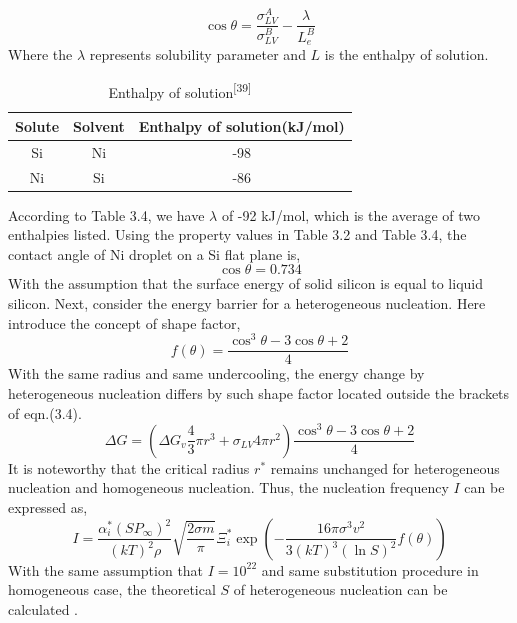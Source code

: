 \begin{equation}
\cos \theta=\frac{\sigma_{L V}^{A}}{\sigma_{L V}^{B}}-\frac{\lambda}{L_{e}^{B}}
\tag{3.1.13}
\end{equation}
Where  the $ \lambda $ represents solubility parameter and $L$ is the enthalpy of solution.
\begin{table}[H]
\caption{Enthalpy of solution\textsuperscript{[39]}}
\centering
\begin{tabular}{ccc}
\toprule
Solute & Solvent & Enthalpy of solution(kJ/mol) \\
\midrule
Si     & Ni      & -98                          \\
Ni     & Si      & -86                          \\
\bottomrule
\end{tabular}
\end{table}
According to Table 3.4,  we have  $ \lambda $ of -92 kJ/mol, which is the average of two enthalpies listed. 
Using the property values in Table 3.2 and Table 3.4, the contact angle of Ni droplet on a Si flat plane is,
\begin{equation}
\cos \theta=0.734
\tag{3.1.14}
\end{equation}
With the assumption that the surface energy of solid silicon is equal to liquid silicon. Next, consider the energy barrier for a heterogeneous nucleation. Here introduce the concept of shape factor,
\begin{equation}
f(\theta)=\frac{\cos ^{3} \theta-3 \cos \theta+2}{4}
\tag{3.1.15}
\end{equation}
With the same radius and same undercooling, the energy change by heterogeneous nucleation differs by such shape factor located outside the brackets of eqn.(3.4).
\begin{equation}
\Delta G=\left(\Delta G_{v} \frac{4}{3} \pi r^{3}+\sigma_{L V} 4 \pi r^{2}\right) \frac{\cos ^{3} \theta-3 \cos \theta+2}{4}
\tag{3.1.16}
\end{equation}
It is noteworthy that the critical radius $r^{*}$ remains unchanged for heterogeneous nucleation and homogeneous nucleation. Thus, the nucleation frequency $I$ can be expressed as,
\begin{equation}
I=\frac{\alpha_{i}^{*}\left(S P_{\infty}\right)^{2}}{(k T)^{2} \rho} \sqrt{\frac{2 \sigma m}{\pi}} \Xi_{i}^{*} \exp \left(-\frac{16 \pi \sigma^{3} v^{2}}{3(k T)^{3}(\ln S)^{2}} f(\theta)\right)
\tag{3.1.17}
\end{equation}
With the same assumption that $I =10^{22}$  and same substitution procedure in homogeneous case, the theoretical $S$ of  heterogeneous nucleation can be calculated .
